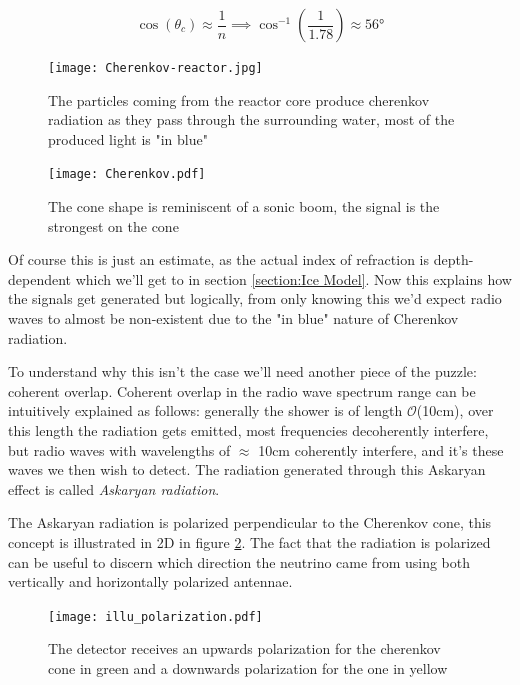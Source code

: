 \begin{equation}
	\cos(\theta_c) \approx \frac{1}{n} \implies \cos^{-1}\left(\frac{1}{1.78}\right)\approx 56\text{°}
\end{equation}
\begin{figure}
\centering
\begin{minipage}{0.45\textwidth}
	\centering
	\texttt{[image: Cherenkov-reactor.jpg]}
	\caption{The particles coming from the reactor core produce cherenkov radiation as they pass through the surrounding water,
	most of the produced light is "in blue"}
	\label{figure: Cherenkov reactor}
\end{minipage}
\hspace{0.05\textwidth}
\begin{minipage}{0.45\textwidth}
	\centering
	\texttt{[image: Cherenkov.pdf]}
	\caption{The cone shape is reminiscent of a sonic boom, the signal is the strongest on the cone }
	\label{figure: Cherenkov illustratie}
\end{minipage}
\end{figure}
Of course this is just an estimate, as the actual index of refraction is depth-dependent which
we'll get to in section \ref{section:Ice Model}.
Now this explains how the signals get generated but logically, from only knowing this
we'd expect radio waves to almost be non-existent 
due to the "in blue" nature of Cherenkov radiation. 

To understand why this isn't the case we'll need another piece of the puzzle: coherent overlap.
Coherent overlap in the radio wave spectrum range can be intuitively explained as
follows: generally the shower is of length
$\mathcal{O}$(10cm)\cite{Huege_2017}, over this length the radiation gets
emitted, most frequencies decoherently interfere, but radio waves with wavelengths of 
$\approx$ 10cm coherently interfere, and it's these waves we then wish to detect.
The radiation generated through this Askaryan effect is called \textit{Askaryan radiation}.

The Askaryan radiation is polarized perpendicular to the Cherenkov cone, this
concept is illustrated in 2D in figure \ref{fig:illupol}.
The fact that the radiation is polarized can be useful to discern which
direction the neutrino came from using both vertically and horizontally
polarized antennae.
\begin{figure}
	\centering
	\texttt{[image: illu\_polarization.pdf]}
	\caption{The detector receives an upwards polarization for the cherenkov cone in green
	and a downwards polarization for the one in yellow}
  	\label{fig:illupol}
\end{figure}

